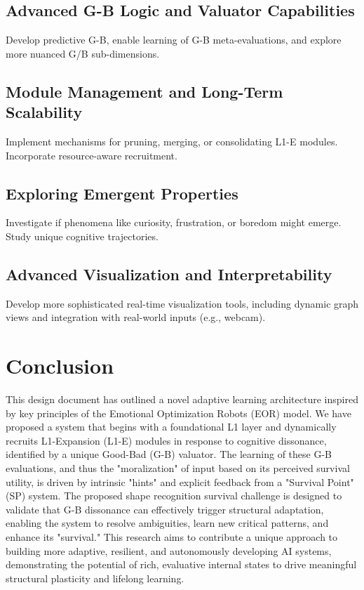 \documentclass{article}
\begin{document}
\subsection{Advanced G-B Logic and Valuator Capabilities}
Develop predictive G-B, enable learning of G-B meta-evaluations, and explore more nuanced G/B sub-dimensions.

\subsection{Module Management and Long-Term Scalability}
Implement mechanisms for pruning, merging, or consolidating L1-E modules. Incorporate resource-aware recruitment.

\subsection{Exploring Emergent Properties}
Investigate if phenomena like curiosity, frustration, or boredom might emerge. Study unique cognitive trajectories.

\subsection{Advanced Visualization and Interpretability}
Develop more sophisticated real-time visualization tools, including dynamic graph views and integration with real-world inputs (e.g., webcam).

\section{Conclusion}
This design document has outlined a novel adaptive learning architecture inspired by key principles of the Emotional Optimization Robots (EOR) model. We have proposed a system that begins with a foundational L1 layer and dynamically recruits L1-Expansion (L1-E) modules in response to cognitive dissonance, identified by a unique Good-Bad (G-B) valuator. The learning of these G-B evaluations, and thus the "moralization" of input based on its perceived survival utility, is driven by intrinsic "hints" and explicit feedback from a "Survival Point" (SP) system. The proposed shape recognition survival challenge is designed to validate that G-B dissonance can effectively trigger structural adaptation, enabling the system to resolve ambiguities, learn new critical patterns, and enhance its "survival." This research aims to contribute a unique approach to building more adaptive, resilient, and autonomously developing AI systems, demonstrating the potential of rich, evaluative internal states to drive meaningful structural plasticity and lifelong learning.
\end{document}

